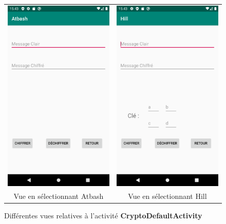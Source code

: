 \documentclass{article}
\begin{document}
\begin{figure}[tb]
    \centering
    \begin{tabular}{cc}
      \includegraphics[width=.35\linewidth]{./img/atbash_ex.png} &
      \includegraphics[width=.35\linewidth]{./img/hill_ex.png} \\
      Vue en sélectionnant Atbash & Vue en sélectionnant Hill\\
    \end{tabular}
    \caption{Différentes vues relatives à l'activité \textbf{CryptoDefaultActivity}\label{fig:exemple}}
\end{figure}
\end{document}
